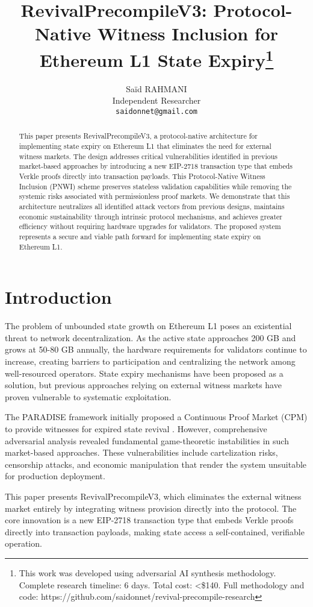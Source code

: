 \documentclass{article}
\title{RevivalPrecompileV3: Protocol-Native Witness Inclusion for Ethereum L1 State Expiry\thanks{This work was developed using adversarial AI synthesis methodology. Complete research timeline: 6 days. Total cost: <\$140. Full methodology and code: https://github.com/saidonnet/revival-precompile-research}}
\author{
  Saïd RAHMANI \\
  Independent Researcher \\
  \texttt{saidonnet@gmail.com}
}
\date{}
\begin{document}
\maketitle

\begin{abstract}
This paper presents RevivalPrecompileV3, a protocol-native architecture for implementing state expiry on Ethereum L1 that eliminates the need for external witness markets. The design addresses critical vulnerabilities identified in previous market-based approaches by introducing a new EIP-2718 transaction type that embeds Verkle proofs directly into transaction payloads. This Protocol-Native Witness Inclusion (PNWI) scheme preserves stateless validation capabilities while removing the systemic risks associated with permissionless proof markets. We demonstrate that this architecture neutralizes all identified attack vectors from previous designs, maintains economic sustainability through intrinsic protocol mechanisms, and achieves greater efficiency without requiring hardware upgrades for validators. The proposed system represents a secure and viable path forward for implementing state expiry on Ethereum L1.
\end{abstract}

\section{Introduction}

The problem of unbounded state growth on Ethereum L1 poses an existential threat to network decentralization. As the active state approaches 200 GB and grows at 50-80 GB annually, the hardware requirements for validators continue to increase, creating barriers to participation and centralizing the network among well-resourced operators. State expiry mechanisms have been proposed as a solution, but previous approaches relying on external witness markets have proven vulnerable to systematic exploitation.

The PARADISE framework initially proposed a Continuous Proof Market (CPM) to provide witnesses for expired state revival \cite{buterin2021statelessness}. However, comprehensive adversarial analysis revealed fundamental game-theoretic instabilities in such market-based approaches. These vulnerabilities include cartelization risks, censorship attacks, and economic manipulation that render the system unsuitable for production deployment.

This paper presents RevivalPrecompileV3, which eliminates the external witness market entirely by integrating witness provision directly into the protocol. The core innovation is a new EIP-2718 transaction type \cite{zoltu2020eip2718} that embeds Verkle proofs \cite{kuszmaul2019verkle} directly into transaction payloads, making state access a self-contained, verifiable operation.
\end{document}
